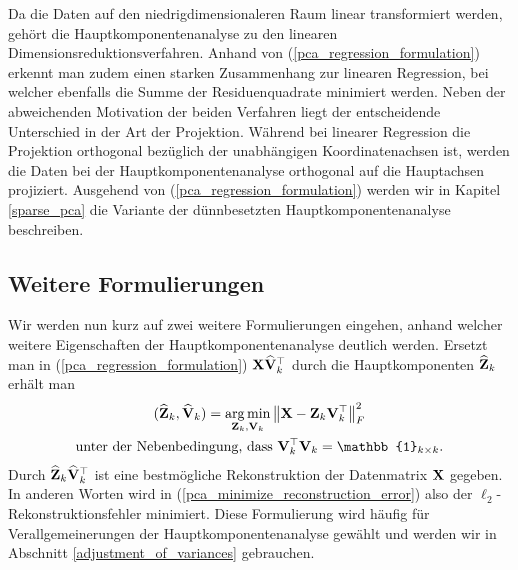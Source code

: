 Da die Daten auf den niedrigdimensionaleren Raum linear transformiert werden, gehört die Hauptkomponentenanalyse zu den linearen Dimensionsreduktionsverfahren. Anhand von (\ref{pca_regression_formulation}) erkennt man zudem einen starken Zusammenhang zur linearen Regression, bei welcher ebenfalls die Summe der Residuenquadrate minimiert werden. Neben der abweichenden Motivation der beiden Verfahren liegt der entscheidende Unterschied in der Art der Projektion. Während bei linearer Regression die Projektion orthogonal bezüglich der unabhängigen Koordinatenachsen ist, werden die Daten bei der Hauptkomponentenanalyse orthogonal auf die Hauptachsen projiziert. Ausgehend von (\ref{pca_regression_formulation}) werden wir in Kapitel \ref{sparse_pca} die Variante der dünnbesetzten Hauptkomponentenanalyse beschreiben.

\subsection{Weitere Formulierungen} 

Wir werden nun kurz auf zwei weitere Formulierungen eingehen, anhand welcher weitere Eigenschaften der Hauptkomponentenanalyse deutlich werden. Ersetzt man in (\ref{pca_regression_formulation}) $\mathbf{X} \widehat{\mathbf{V}}_k^{\top}$ durch die Hauptkomponenten $\widehat{\mathbf{Z}}_k$ erhält man
\begin{align}
\label{pca_minimize_reconstruction_error}
\begin{gathered}
(\widehat{\mat{Z}}_k, \widehat{\mat V}_k) = \argmin_{\mat Z_k, \mat V_k} \norm{\mat X - \mat Z_k \mat V_k^{\top}}_{F}^{2}\\
\text{unter der Nebenbedingung, dass } \mat V_k^{\top}\mat V_k = \mat{\mathbb{1}}_{k \times k}.
\end{gathered}
\end{align}
Durch $\widehat{\mathbf{Z}}_k \widehat{\mathbf{V}}_k^{\top}$ ist eine bestmögliche Rekonstruktion der Datenmatrix $\mathbf{X}$ gegeben. In anderen Worten wird in (\ref{pca_minimize_reconstruction_error}) also der $\ell_2$-Rekonstruktionsfehler minimiert. Diese Formulierung wird häufig für Verallgemeinerungen der Hauptkomponentenanalyse gewählt und werden wir in Abschnitt \ref{adjustment_of_variances} gebrauchen.

